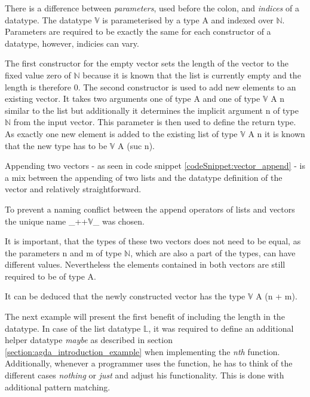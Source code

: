There is a difference between \emph{parameters}, used before the colon, and \emph{indices} of a datatype.
The datatype $\mathbb{V}$ is parameterised by a type A and indexed over $\mathbb{N}$\cite{norell:deptyped}.
Parameters are required to be exactly the same for each constructor of a datatype, however, indicies can vary.

The first constructor for the empty vector sets the length of the vector to the fixed value zero of $\mathbb{N}$ because it is known that the list is currently empty and the length is therefore 0.
The second constructor is used to add new elements to an existing vector. It takes two arguments one of type A and one of type $\mathbb{V}$ A n similar to the list but additionally it determines the implicit argument n of type $\mathbb{N}$ from the input vector.
This parameter is then used to define the return type. As exactly one new element is added to the existing list of type $\mathbb{V}$ A n it is known that the new type has to be $\mathbb{V}$ A (suc n).

Appending two vectors - as seen in code snippet \ref{codeSnippet:vector_append} - is a mix between the appending of two lists and the datatype definition of the vector and relatively straightforward.

\begin{codesnippet}[mathescape=true, caption={Definition of the vector append function in Agda}, label={codeSnippet:vector_append}]
_++$\mathbb{V}$_ : $\forall$ {$\ell$} {A : Set $\ell$}  {n m: $\mathbb{N}$ $\rightarrow$
        $\mathbb{V}$ A n $\rightarrow \mathbb{V}$ A m $\rightarrow \mathbb{V}$ A (n + m)
  []        ++$\mathbb{V}$ ys = ys
  (x :: xs) ++$\mathbb{V}$ ys = x :: (xs ++$\mathbb{V}$ ys)
\end{codesnippet}

To prevent a naming conflict between the append operators of lists and vectors the unique name \_++$\mathbb{V}$\_ was chosen.

It is important, that the types of these two vectors does not need to be equal, as the parameters n and m of type $\mathbb{N}$, which are also a part of the types, can have different values. 
Nevertheless the elements contained in both vectors are still required to be of type A.

It can be deduced that the newly constructed vector has the type $\mathbb{V}$ A (n + m).

The next example will present the first benefit of including the length in the datatype.
In case of the list datatype $\mathbb{L}$, it was required to define an additional helper datatype \emph{maybe} as described in section \ref{section:agda_introduction_example} when implementing the \emph{nth} function.
Additionally, whenever a programmer uses the function, he has to think of the different cases \emph{nothing} or \emph{just} and adjust his functionality. This is done with additional pattern matching.

